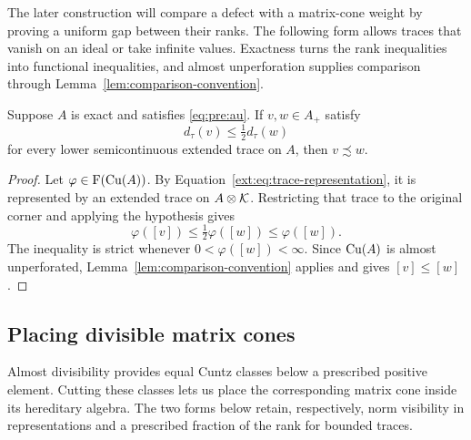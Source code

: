 The later construction will compare a defect with a matrix-cone weight
by proving a uniform gap between their ranks. The following form allows
traces that vanish on an ideal or take infinite values. Exactness turns
the rank inequalities into functional inequalities, and almost
unperforation supplies comparison through
Lemma~\ref{lem:comparison-convention}.

\begin{lemma}
\label{lem:G}
Suppose \(A\) is exact and satisfies \eqref{eq:pre:au}. If \(v,w\in A_+\)
satisfy
\[
 d_\tau(v)\le\tfrac12d_\tau(w)
\]
for every lower semicontinuous extended trace on \(A\), then
\(v\precsim w\).
\end{lemma}

\begin{proof}
Let $\varphi\in\mathrm F(\mathrm{Cu}(A))$. By
Equation~\eqref{ext:eq:trace-representation}, it is represented by an
extended trace on $A\otimes\mathcal K$. Restricting that trace to the original
corner and applying the hypothesis gives
\[
 \varphi([v])\le\tfrac12\varphi([w])\le\varphi([w]).
\]
The inequality is strict whenever $0<\varphi([w])<\infty$.
Since $\mathrm{Cu}(A)$ is almost unperforated,
Lemma~\ref{lem:comparison-convention} applies and gives $[v]\le[w]$.
\end{proof}

\subsection{Placing divisible matrix cones}

Almost divisibility provides equal Cuntz classes below a prescribed
positive element. Cutting these classes lets us place the corresponding
matrix cone inside its hereditary algebra. The two forms below retain,
respectively, norm visibility in representations and a prescribed
fraction of the rank for bounded traces.


